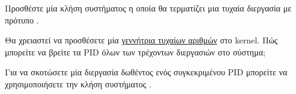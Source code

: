 \documentclass[18pt]{extarticle}
\begin{document}
\begin{question}
    Προσθέστε μία κλήση συστήματος η οποία θα τερματίζει μια τυχαία διεργασία με πρότυπο .

    Θα χρειαστεί να προσθέσετε μία \href{https://wiki.osdev.org/Random_Number_Generator#Pseudorandom_number_generators}{γεννήτρια τυχαίων αριθμών} στο kernel.
    Πώς μπορείτε να βρείτε τα PID όλων των τρέχοντων διεργασιών στο σύστημα;

    \begin{info}[Σημείωση:]
        Για να σκοτώσετε μία διεργασία δωθέντος ενός συγκεκριμένου PID
        μπορείτε να χρησιμοποιήσετε την κλήση συστήματος .
    \end{info}
\end{question}


\printbibliography
\end{document}
